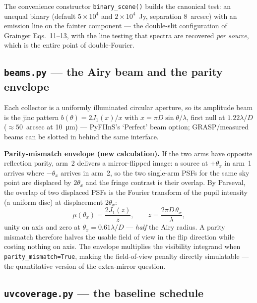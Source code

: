 \documentclass[11pt]{article}
\newcommand{\code}[1]{\texttt{\small #1}}
\newcommand{\file}[1]{\textcolor{plumdark}{\texttt{\small #1}}}
\begin{document}
The convenience constructor \code{binary\_scene()} builds the canonical test:
an unequal binary (default $5\times10^4$ and $2\times10^4$~Jy, separation
8~arcsec) with an emission line on the fainter component --- the double-slit
configuration of Grainger Eqs.~11--13, with the line testing that spectra are
recovered \emph{per source}, which is the entire point of double-Fourier.

\subsection{\file{beams.py} --- the Airy beam and the parity envelope}

\begin{physicsbox}
Each collector is a uniformly illuminated circular aperture, so its
amplitude beam is the jinc pattern $b(\theta) = 2J_1(x)/x$ with
$x = \pi D \sin\theta/\lambda$, first null at $1.22\lambda/D$
($\approx 50$~arcsec at \SI{10}{\micro\metre}) --- PyFIInS's `Perfect' beam
option; GRASP/measured beams can be slotted in behind the same interface.

\textbf{Parity-mismatch envelope (new calculation).} If the two arms have
opposite reflection parity, arm~2 delivers a mirror-flipped image: a source
at $+\theta_x$ in arm~1 arrives where $-\theta_x$ arrives in arm~2, so the
two single-arm PSFs for the same sky point are displaced by $2\theta_x$ and
the fringe contrast is their overlap. By Parseval, the overlap of two
displaced PSFs is the Fourier transform of the pupil intensity (a uniform
disc) at displacement $2\theta_x$:
\begin{equation}
\mu(\theta_x) = \frac{2J_1(z)}{z}, \qquad
z = \frac{2\pi D\,\theta_x}{\lambda},
\end{equation}
unity on axis and zero at $\theta_x = 0.61\lambda/D$ --- \emph{half} the Airy
radius. A parity mismatch therefore halves the usable field of view in the
flip direction while costing nothing on axis. The envelope multiplies the
visibility integrand when \code{parity\_mismatch=True}, making the
field-of-view penalty directly simulatable --- the quantitative version of
the extra-mirror question.
\end{physicsbox}

\subsection{\file{uvcoverage.py} --- the baseline schedule}
\end{document}
